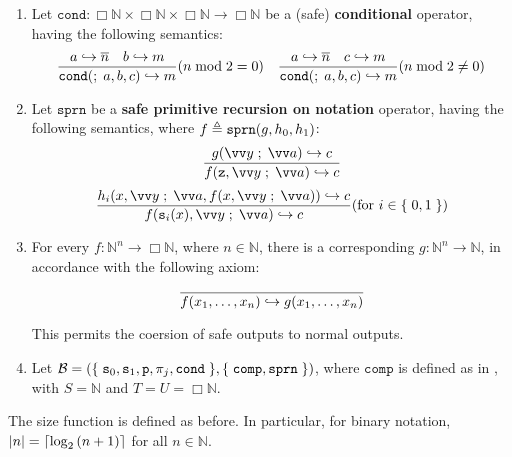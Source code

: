 \begin{definition}
\begin{enumerate}[label=(\arabic*)]
\item Let $\mathtt{cond} : \Box\mathbb{N} \times \Box\mathbb{N} \times
\Box\mathbb{N} \rightarrow \Box\mathbb{N}$ be a (safe) \textbf{conditional}
operator, having the following semantics:$$
%
\judgement{
%
  a \goesto \repr{n} \quad b \goesto m
%
}{
%
  \mathtt{cond}\p{\semic{} a, b, c} \goesto m
%
}\p{n \bmod 2 = 0}
%
\quad\judgement{
%
  a \goesto \repr{n} \quad c \goesto m
%
}{
%
  \mathtt{cond}\p{\semic{} a, b, c} \goesto m
%
}\p{n \bmod 2 \neq 0}
%
$$

\item Let $\mathtt{sprn}$ be a \textbf{safe primitive recursion on notation}
operator, having the following semantics, where $f \triangleq
\mathtt{sprn}{\mathopen{}\left({g, h_0, h_1}\right)\mathclose{}}$:\begin{align*}
%
\judgement{
%
  g\p{\vect{y} \semic{} \vect{a}} \goesto c
%
}{
%
  f\p{\mathtt{z}, \vect{y} \semic{} \vect{a}} \goesto c
%
}\end{align*}\begin{align*}
%
\judgement{
%
  h_i\p{x, \vect{y} \semic{} \vect{a}, f\p{x,\vect{y} \semic{} \vect{a}}}
\goesto c
%
}{
%
  f\p{\mathtt{s}_i\p{x}, \vect{y} \semic{} \vect{a}} \goesto c
%
}\p{\text{for $i\in\set{0,1}$}}
%
\end{align*}

\item For every $f : \mathbb{N}^n \rightarrow \Box\mathbb{N}$, where $n \in
\mathbb{N}$, there is a corresponding $g : \mathbb{N}^n \rightarrow
\mathbb{N}$, in accordance with the following axiom:\begin{align*}
%
\axiom{f\p{x_1,\ldots,x_n} \goesto g\p{x_1,\ldots,x_n}}
%
\end{align*}

This permits the coersion of safe outputs to normal outputs.

\item Let $\mathcal{B} = {\mathopen{}\left({\mathopen{}\left\{\mathrel{}{\mathtt{s}_0, \mathtt{s}_1, \mathtt{p}, \pi_j,
\mathtt{cond}}\mathrel{}\right\}\mathclose{},\mathopen{}\left\{\mathrel{}{\mathtt{comp}, \mathtt{sprn}}\mathrel{}\right\}\mathclose{}}\right)\mathclose{}} $, where $\mathtt{comp}$ is
defined as in , with $S=\mathbb{N}$ and
$T=U=\Box\mathbb{N}$.

\end{enumerate}

\end{definition}

\begin{remark} The size function is defined as before. In particular, for
binary notation, ${\mathopen{}\left|{n}\right|\mathclose{}}=\mathopen{}\left\lceil{\log_2{\ensuremath{\mathopen{}\left({n+1}\right)\mathclose{}}}}\right\rceil\mathclose{}$ for all $n \in \mathbb{N}$.
\end{remark}


